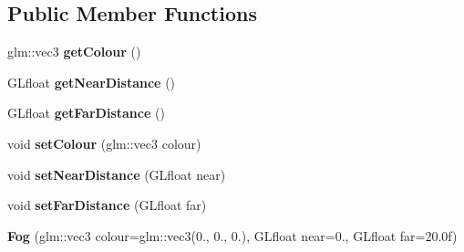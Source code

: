 \subsection*{Public Member Functions}
\begin{DoxyCompactItemize}
\item 
\hypertarget{classfillwave_1_1effects_1_1Fog_abb5ae920df6298b4336a2ed4e702a955}{}glm\+::vec3 {\bfseries get\+Colour} ()\label{classfillwave_1_1effects_1_1Fog_abb5ae920df6298b4336a2ed4e702a955}

\item 
\hypertarget{classfillwave_1_1effects_1_1Fog_a26f0b406b8e6b9629fc9e9e3b9bb625b}{}G\+Lfloat {\bfseries get\+Near\+Distance} ()\label{classfillwave_1_1effects_1_1Fog_a26f0b406b8e6b9629fc9e9e3b9bb625b}

\item 
\hypertarget{classfillwave_1_1effects_1_1Fog_a8b74e06482d55497ee8af7a7a728e534}{}G\+Lfloat {\bfseries get\+Far\+Distance} ()\label{classfillwave_1_1effects_1_1Fog_a8b74e06482d55497ee8af7a7a728e534}

\item 
\hypertarget{classfillwave_1_1effects_1_1Fog_a79ae82e784fcbbc60886ecd052d5acea}{}void {\bfseries set\+Colour} (glm\+::vec3 colour)\label{classfillwave_1_1effects_1_1Fog_a79ae82e784fcbbc60886ecd052d5acea}

\item 
\hypertarget{classfillwave_1_1effects_1_1Fog_acabf149d0aee3fcbb38783db783b5a8b}{}void {\bfseries set\+Near\+Distance} (G\+Lfloat near)\label{classfillwave_1_1effects_1_1Fog_acabf149d0aee3fcbb38783db783b5a8b}

\item 
\hypertarget{classfillwave_1_1effects_1_1Fog_a635e0de9761fd2cdb1847534cef6f6f9}{}void {\bfseries set\+Far\+Distance} (G\+Lfloat far)\label{classfillwave_1_1effects_1_1Fog_a635e0de9761fd2cdb1847534cef6f6f9}

\item 
\hypertarget{classfillwave_1_1effects_1_1Fog_aa5535dd253110c88f9e3be21095ca4e4}{}{\bfseries Fog} (glm\+::vec3 colour=glm\+::vec3(0., 0., 0.), G\+Lfloat near=0., G\+Lfloat far=20.\+0f)\label{classfillwave_1_1effects_1_1Fog_aa5535dd253110c88f9e3be21095ca4e4}


\end{DoxyCompactItemize}
